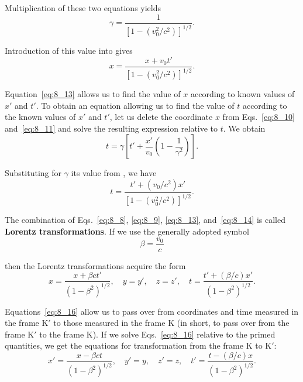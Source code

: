 Multiplication of these two equations yields
\begin{equation}\label{eq:8_12}
	\gamma = \frac{1}{\left[1 - \left(v_0^2/c^2\right)\right]^{1/2}}.
\end{equation}

\noindent
Introduction of this value into  gives
\begin{equation}\label{eq:8_13}
	x = \frac{x + v_0 t'}{\left[1 - \left(v_0^2/c^2\right)\right]^{1/2}}.
\end{equation}

Equation~\eqref{eq:8_13} allows us to find the value of $x$ according to known values of $x'$ and $t'$. To obtain an equation allowing us to find the value of $t$ according to the known values of $x'$ and $t'$, let us delete the coordinate $x$ from Eqs.~\eqref{eq:8_10} and~\eqref{eq:8_11} and solve the resulting expression relative to $t$. We obtain
\begin{equation*}
	t = \gamma \left[t' + \frac{x'}{v_0}\left(1 - \frac{1}{\gamma^2}\right)\right].
\end{equation*}

\noindent
Substituting for $\gamma$ its value from , we have
\begin{equation}\label{eq:8_14}
	t = \frac{t' + (v_0/c^2) x'}{\left[1 - \left(v_0^2/c^2\right)\right]^{1/2}}.
\end{equation}

The combination of Eqs.~\eqref{eq:8_8}, \eqref{eq:8_9}, \eqref{eq:8_13}, and~\eqref{eq:8_14} is called \textbf{Lorentz transformations}. If we use the generally adopted symbol
\begin{equation}\label{eq:8_15}
	\beta = \frac{v_0}{c}
\end{equation}

\noindent
then the Lorentz transformations acquire the form
\begin{equation}\label{eq:8_16}
	x = \frac{x + \beta ct'}{\left(1 - \beta^2\right)^{1/2}},\quad y = y',\quad z = z',\quad t = \frac{t' + (\beta/c) x'}{\left(1 - \beta^2\right)^{1/2}}.
\end{equation}

Equations~\eqref{eq:8_16} allow us to pass over from coordinates and time measured in the frame K$'$ to those measured in the frame K (in short, to pass over from the frame K$'$ to the frame K). If we solve Eqs.~\eqref{eq:8_16} relative to the primed quantities, we get the equations for transformation from the frame K to K$'$:
\begin{equation}\label{eq:8_17}
	x' = \frac{x - \beta ct}{\left(1 - \beta^2\right)^{1/2}},\quad y' = y,\quad z' = z,\quad t' = \frac{t - (\beta/c) x}{\left(1 - \beta^2\right)^{1/2}}.
\end{equation}


